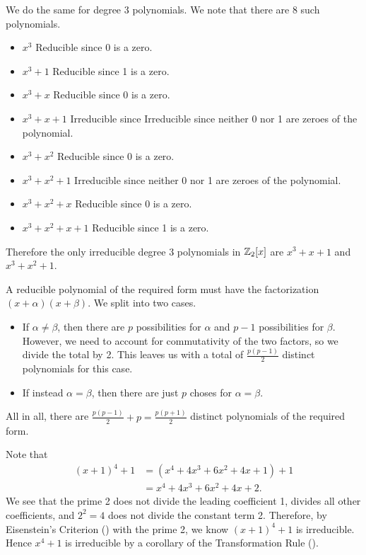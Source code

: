 \begin{questions}
\begin{partquestions}{\alph*}
        \item We do the same for degree 3 polynomials. We note that there are 8 such polynomials.
        \begin{itemize}
            \item $\boxed{x^3}$ Reducible since 0 is a zero.
            \item $\boxed{x^3 + 1}$ Reducible since 1 is a zero.
            \item $\boxed{x^3 + x}$ Reducible since 0 is a zero.
            \item $\boxed{x^3 + x + 1}$ Irreducible since Irreducible since neither 0 nor 1 are zeroes of the polynomial.
            \item $\boxed{x^3 + x^2}$ Reducible since 0 is a zero.
            \item $\boxed{x^3 + x^2 + 1}$ Irreducible since neither 0 nor 1 are zeroes of the polynomial.
            \item $\boxed{x^3 + x^2 + x}$ Reducible since 0 is a zero.
            \item $\boxed{x^3 + x^2 + x + 1}$ Reducible since 1 is a zero.
        \end{itemize}
        Therefore the only irreducible degree 3 polynomials in $\mathbb{Z}_2[x]$ are $x^3+x+1$ and $x^3+x^2+1$.
    \end{partquestions}

    \item A reducible polynomial of the required form must have the factorization $(x+\alpha)(x+\beta)$. We split into two cases.
    \begin{itemize}
        \item If $\alpha \neq \beta$, then there are $p$ possibilities for $\alpha$ and $p - 1$ possibilities for $\beta$. However, we need to account for commutativity of the two factors, so we divide the total by 2. This leaves us with a total of $\frac{p(p-1)}{2}$ distinct polynomials for this case.
        \item If instead $\alpha = \beta$, then there are just $p$ choses for $\alpha = \beta$.
    \end{itemize}
    All in all, there are $\frac{p(p-1)}{2} + p = \frac{p(p+1)}{2}$ distinct polynomials of the required form.
    
    \item \begin{partquestions}{\alph*}
        \item Note that
        \begin{align*}
            (x+1)^4 + 1 &= (x^4 + 4x^3 + 6x^2 + 4x + 1) + 1\\
            &= x^4 + 4x^3 + 6x^2 + 4x + 2.
        \end{align*}
        We see that the prime 2 does not divide the leading coefficient 1, divides all other coefficients, and $2^2 = 4$ does not divide the constant term 2. Therefore, by Eisenstein's Criterion () with the prime 2, we know $(x+1)^4 + 1$ is irreducible. Hence $x^4 + 1$ is irreducible by a corollary of the Transformation Rule ().
        

\end{partquestions}
\end{questions}
